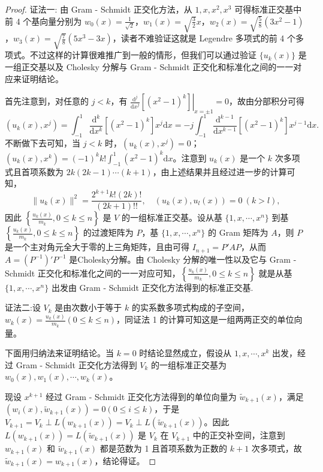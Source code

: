 \documentclass[../../main.tex]{subfiles}
\begin{document}
\begin{proof}
{\color{blue}证法一:}
由 Gram - Schmidt 正交化方法，从 $1,x,x^2,x^3$ 可得标准正交基中前 4 个基向量分别为 $w_0(x)=\frac{1}{\sqrt{2}}$，$w_1(x)=\sqrt{\frac{3}{2}}x$，$w_2(x)=\sqrt{\frac{5}{8}}(3x^2 - 1)$，$w_3(x)=\sqrt{\frac{7}{8}}(5x^3 - 3x)$，读者不难验证这就是 Legendre 多项式的前 4 个多项式。不过这样的计算很难推广到一般的情形，但我们可以通过验证 $\{u_k(x)\}$ 是一组正交基以及 Cholesky 分解与 Gram - Schmidt 正交化和标准化之间的一一对应来证明结论。

首先注意到，对任意的 $j < k$，有 $\left.\frac{\mathrm{d}^j}{\mathrm{d}x^j}[(x^2 - 1)^k]\right|_{x = \pm1}=0$，故由分部积分可得
\[
(u_k(x),x^j)=\int_{-1}^{1}\frac{\mathrm{d}^k}{\mathrm{d}x^k}[(x^2 - 1)^k]x^j\mathrm{d}x=-j\int_{-1}^{1}\frac{\mathrm{d}^{k - 1}}{\mathrm{d}x^{k - 1}}[(x^2 - 1)^k]x^{j - 1}\mathrm{d}x.
\]
不断做下去可知，当 $j < k$ 时，$(u_k(x),x^j)=0$；$(u_k(x),x^k)=(-1)^kk!\int_{-1}^{1}(x^2 - 1)^k\mathrm{d}x$。注意到 $u_k(x)$ 是一个 $k$ 次多项式且首项系数为 $2k(2k - 1)\cdots(k + 1)$，由上述结果并且经过进一步的计算可知，
\[
\|u_k(x)\|^2=\frac{2^{k + 1}k!(2k)!}{(2k + 1)!!},\quad (u_k(x),u_l(x))=0\ (k > l),
\]
因此 $\left\{\frac{u_k(x)}{m_k},0\leqslant  k\leqslant  n\right\}$ 是 $V$ 的一组标准正交基。设从基 $\{1,x,\cdots,x^n\}$ 到基 $\left\{\frac{u_k(x)}{m_k},0\leqslant  k\leqslant  n\right\}$ 的过渡矩阵为 $P$，基 $\{1,x,\cdots,x^n\}$ 的 Gram 矩阵为 $A$，则 $P$ 是一个主对角元全大于零的上三角矩阵，且由可得 $I_{n + 1}=P'AP$，从而 $A=(P^{-1})'P^{-1}$ 是Cholesky分解。由 Cholesky 分解的唯一性以及它与 Gram - Schmidt 正交化和标准化之间的一一对应可知，$\left\{\frac{u_k(x)}{m_k},0\leqslant  k\leqslant  n\right\}$ 就是从基 $\{1,x,\cdots,x^n\}$ 出发由 Gram - Schmidt 正交化方法得到的标准正交基.

{\color{blue}证法二:}设 $V_k$ 是由次数小于等于 $k$ 的实系数多项式构成的子空间，$w_k(x) = \frac{u_k(x)}{m_k} (0 \leqslant  k \leqslant  n)$，同证法 1 的计算可知这是一组两两正交的单位向量。

下面用归纳法来证明结论。当 $k = 0$ 时结论显然成立，假设从 $1, x, \cdots, x^k$ 出发，经过 Gram - Schmidt 正交化方法得到 $V_k$ 的一组标准正交基为 $w_0(x), w_1(x), \cdots, w_k(x)$。

现设 $x^{k + 1}$ 经过 Gram - Schmidt 正交化方法得到的单位向量为 $\widetilde{w}_{k + 1}(x)$，满足 $(w_i(x), \widetilde{w}_{k + 1}(x)) = 0 (0 \leqslant  i \leqslant  k)$，于是 $V_{k + 1} = V_k \perp L(w_{k + 1}(x)) = V_k \perp L(\widetilde{w}_{k + 1}(x))$。因此 $L(w_{k + 1}(x)) = L(\widetilde{w}_{k + 1}(x))$ 是 $V_k$ 在 $V_{k + 1}$ 中的正交补空间，注意到 $w_{k + 1}(x)$ 和 $\widetilde{w}_{k + 1}(x)$ 都是范数为 1 且首项系数为正数的 $k + 1$ 次多项式，故 $\widetilde{w}_{k + 1}(x) = w_{k + 1}(x)$，结论得证。

\end{proof}
\end{document}
